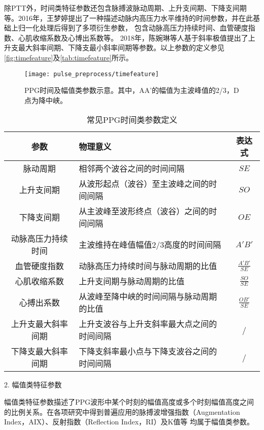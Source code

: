 除PTT外，时间类特征参数还包含脉搏波脉动周期、上升支间期、下降支间期等。2016年，王梦婷提出了一种描述动脉内高压力水平维持的时间参数，并在此基础上归一化处理后得到了多项衍生参数，
包含动脉高压力持续时间、血管硬度指数、心肌收缩系数及心博出系数等\cite{mmt}。
2018年，陈婉琳等人基于斜率极值提出了上升支最大斜率间期、下降支最小斜率间期等参数\cite{cwl}。以上参数的定义参见\autoref{fig:timefeature}及\autoref{tab:timefeature}所示。
\begin{figure}[htbp]
    \centering
    \texttt{[image: pulse\_preprocess/timefeature]}
    \caption[PPG时间及幅值类参数示意]{\label{fig:timefeature}PPG时间及幅值类参数示意。其中，AA'的幅值为主波峰值的2/3，D点为降中峡。}
\end{figure}
\begin{table}[h]
    \centering
    \caption{\label{tab:timefeature}常见PPG时间类参数定义}
    \begin{tabularx}{\linewidth}{cX<{\centering}c}
    \toprule
    \textbf{参数} & \textbf{物理意义} & \textbf{表达式} \\
    \midrule
    脉动周期      &  相邻两个波谷之间的时间间隔         &  $SE$\\
    上升支间期      &  从波形起点（波谷）至主波峰之间的时间间隔         &  $SO$\\
    下降支间期      &  从主波峰至波形终点（波谷）之间的时间间隔        &  $OE$\\
    动脉高压力持续时间    &  主波维持在峰值幅值2/3高度的时间间隔         &    $A'B'$   \\
    血管硬度指数    &  动脉高压力持续时间与脉动周期的比值         &   $\frac{A'B'}{SE}$    \\
    心肌收缩系数    &  上升支间期与脉动周期的比值         &  $\frac{SO}{SE}$    \\
    心搏出系数      &   从波峰至降中峡的时间间隔与脉动周期的比值       &   $\frac{OB'}{SE}$\\
    上升支最大斜率间期      &   上升支波谷与上升支斜率最大点之间的时间间隔      &   /    \\
    下降支最大斜率间期      &   下降支斜率最小点与下降支波谷之间的时间间隔      &    /  \\
    \bottomrule
    \end{tabularx}
\end{table}

2. 幅值类特征参数

幅值类特征参数描述了PPG波形中某个时刻的幅值高度或多个时刻幅值高度之间的比例关系。在各项研究中得到普遍应用的脉搏波增强指数（Augmentation Index，AIX）、反射指数（Reflection Index，RI）及K值等
均属于幅值类参数。

